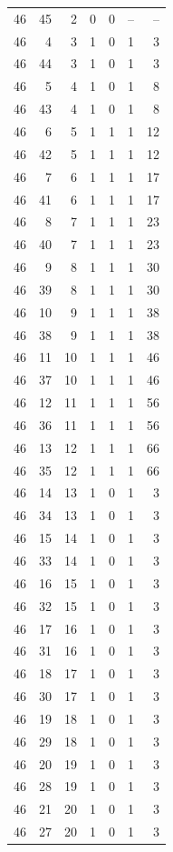 \begin{longtable}{rrrrrrr}
46 & 45 & 2 & 0 & 0 & -- & --\\
46 & 4 & 3 & 1 & 0 & 1 & 3\\
46 & 44 & 3 & 1 & 0 & 1 & 3\\
46 & 5 & 4 & 1 & 0 & 1 & 8\\
46 & 43 & 4 & 1 & 0 & 1 & 8\\
46 & 6 & 5 & 1 & 1 & 1 & 12\\
46 & 42 & 5 & 1 & 1 & 1 & 12\\
46 & 7 & 6 & 1 & 1 & 1 & 17\\
46 & 41 & 6 & 1 & 1 & 1 & 17\\
46 & 8 & 7 & 1 & 1 & 1 & 23\\
46 & 40 & 7 & 1 & 1 & 1 & 23\\
46 & 9 & 8 & 1 & 1 & 1 & 30\\
46 & 39 & 8 & 1 & 1 & 1 & 30\\
46 & 10 & 9 & 1 & 1 & 1 & 38\\
46 & 38 & 9 & 1 & 1 & 1 & 38\\
46 & 11 & 10 & 1 & 1 & 1 & 46\\
46 & 37 & 10 & 1 & 1 & 1 & 46\\
46 & 12 & 11 & 1 & 1 & 1 & 56\\
46 & 36 & 11 & 1 & 1 & 1 & 56\\
46 & 13 & 12 & 1 & 1 & 1 & 66\\
46 & 35 & 12 & 1 & 1 & 1 & 66\\
46 & 14 & 13 & 1 & 0 & 1 & 3\\
46 & 34 & 13 & 1 & 0 & 1 & 3\\
46 & 15 & 14 & 1 & 0 & 1 & 3\\
46 & 33 & 14 & 1 & 0 & 1 & 3\\
46 & 16 & 15 & 1 & 0 & 1 & 3\\
46 & 32 & 15 & 1 & 0 & 1 & 3\\
46 & 17 & 16 & 1 & 0 & 1 & 3\\
46 & 31 & 16 & 1 & 0 & 1 & 3\\
46 & 18 & 17 & 1 & 0 & 1 & 3\\
46 & 30 & 17 & 1 & 0 & 1 & 3\\
46 & 19 & 18 & 1 & 0 & 1 & 3\\
46 & 29 & 18 & 1 & 0 & 1 & 3\\
46 & 20 & 19 & 1 & 0 & 1 & 3\\
46 & 28 & 19 & 1 & 0 & 1 & 3\\
46 & 21 & 20 & 1 & 0 & 1 & 3\\
46 & 27 & 20 & 1 & 0 & 1 & 3\\

\end{longtable}
